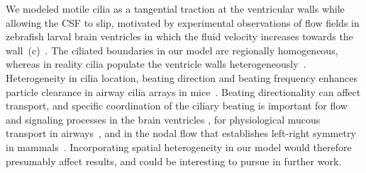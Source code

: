 \documentclass{WileyMSP-template}
\begin{document}
We modeled motile cilia as a tangential
traction at the ventricular walls
while allowing the CSF to slip,
motivated by experimental observations of
flow fields in zebrafish larval brain ventricles in which
the fluid velocity increases towards the
wall~(c)~\cite{Olstad2019CiliaryDevelopment}. 
The ciliated boundaries in our model are regionally homogeneous,
whereas in reality cilia populate the ventricle walls
heterogeneously~\cite{Olstad2019CiliaryDevelopment}. Heterogeneity
in cilia location, beating direction and beating frequency
enhances particle clearance in airway cilia arrays
in mice~\cite{Ramirez-SanJuan2020Multi-scaleArrays}.
Beating directionality can affect transport,
and specific coordination of the ciliary beating is important for
flow and signaling processes in the brain ventricles
\cite{Eichele2020Cilia-drivenVentricle, Olstad2019CiliaryDevelopment,
Faubel2016Cilia-basedVentricles, Guirao2010CouplingCilia, Afzelius2004CiliaRelatedDiseases,
Pellicciotta2020Cilia},
for physiological mucous transport in
airways~\cite{Rayner1996CiliarySyndrome, Schneiter2021Multi-scaleFunction,
Bustamante-Marin2019LackClearance, Tsukita2012CoordinatedFeet},
and in the nodal flow that establishes
left-right symmetry in mammals~\cite{Yoshiba2014RolesSymmetry, Hirokawa2006NodalAsymmetry, Sawamoto2006NewBrain}.
Incorporating spatial heterogeneity in our model would
therefore presumably affect results, and could be
interesting to pursue in further work.
\end{document}
